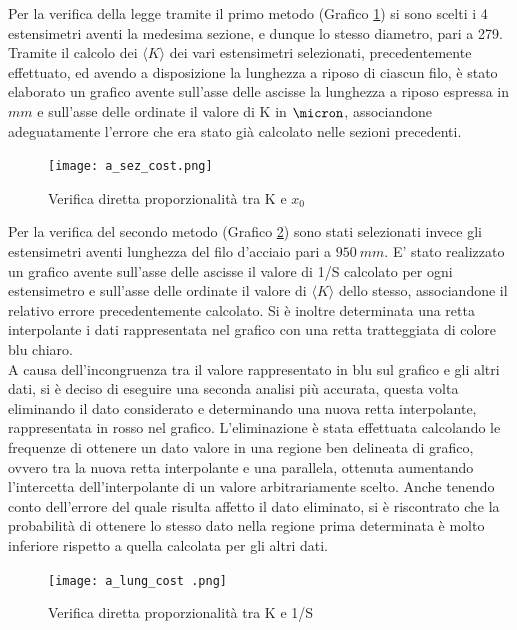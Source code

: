 \documentclass[a4paper,11pt,oneside]{article}
\begin{document}
Per la verifica della legge tramite il primo metodo (Grafico \ref{fig:a_sezione_cost}) si sono scelti i 4  estensimetri aventi la medesima sezione, e dunque lo stesso diametro, pari a \SI{279}{\micron}. Tramite il calcolo dei $\langle K \rangle$ dei vari estensimetri selezionati, precedentemente effettuato, ed avendo a disposizione la lunghezza a riposo di ciascun filo, è stato elaborato un grafico avente sull'asse delle ascisse la lunghezza a riposo espressa in $mm$ e sull'asse delle ordinate il valore di K in $\micron$, associandone adeguatamente l'errore che era stato già calcolato nelle sezioni precedenti.

\begin{figure}[h!]
    \centering

        \label{fig:a_sezione_cost}
        \texttt{[image: a\_sez\_cost.png]}
        \caption{Verifica diretta proporzionalità tra K e $x_0$}
        
\end{figure}
Per la verifica del secondo metodo (Grafico \ref{fig:a_lunghezza_cost}) sono stati selezionati invece gli estensimetri aventi lunghezza del filo d'acciaio pari a $\SI{950}{mm}$. E' stato realizzato un grafico avente sull'asse delle ascisse il valore di 1/S  calcolato per ogni estensimetro e sull'asse delle ordinate il valore di $\langle K \rangle$ dello stesso, associandone il relativo errore precedentemente calcolato. Si è inoltre determinata una retta interpolante i dati rappresentata nel grafico con una retta tratteggiata di colore blu chiaro.\\
A causa dell'incongruenza tra il valore rappresentato in blu sul grafico e gli altri dati, si è deciso di eseguire una seconda analisi più accurata, questa volta eliminando il dato considerato e determinando una nuova retta interpolante, rappresentata in rosso nel grafico. L'eliminazione è stata effettuata calcolando le frequenze di ottenere un dato valore in una regione ben delineata di grafico, ovvero tra la nuova retta interpolante e una parallela, ottenuta aumentando l'intercetta dell'interpolante di un valore arbitrariamente scelto. Anche tenendo conto dell'errore del quale risulta affetto il dato eliminato, si è riscontrato che la probabilità di ottenere lo stesso dato nella regione prima determinata è molto inferiore rispetto a quella calcolata per gli altri dati.


\begin{figure}[h!]
    \centering
    
        \label{fig:a_lunghezza_cost}
        \texttt{[image: a\_lung\_cost .png]}
        \caption{Verifica diretta proporzionalità tra K e 1/S}
\end{figure}
\end{document}
